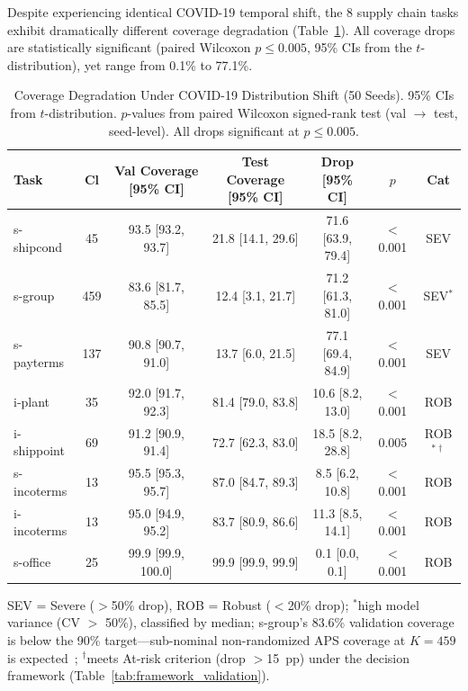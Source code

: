 \documentclass{uai2026} %
\begin{document}
Despite experiencing identical COVID-19 temporal shift, the 8 supply chain tasks exhibit dramatically different coverage degradation (Table~\ref{tab:main_results}). All coverage drops are statistically significant (paired Wilcoxon $p \leq 0.005$, 95\% CIs from the $t$-distribution), yet range from 0.1\% to 77.1\%.

\begin{table}[t]
\centering
\caption{Coverage Degradation Under COVID-19 Distribution Shift (50 Seeds).
95\% CIs from $t$-distribution. $p$-values from paired Wilcoxon signed-rank test
(val $\rightarrow$ test, seed-level). All drops significant at $p \leq 0.005$.}\label{tab:main_results}
\small
\begin{tabular}{@{}lcccccc@{}}
\toprule
Task & Cl & Val Coverage [95\% CI] & Test Coverage [95\% CI] & Drop [95\% CI] & $p$ & Cat \\
\midrule
s-shipcond & 45 & 93.5 [93.2, 93.7] & 21.8 [14.1, 29.6] & 71.6 [63.9, 79.4] & $<$0.001 & SEV \\
s-group & 459 & 83.6 [81.7, 85.5] & 12.4 [3.1, 21.7] & 71.2 [61.3, 81.0] & $<$0.001 & SEV$^*$ \\
s-payterms & 137 & 90.8 [90.7, 91.0] & 13.7 [6.0, 21.5] & 77.1 [69.4, 84.9] & $<$0.001 & SEV \\
i-plant & 35 & 92.0 [91.7, 92.3] & 81.4 [79.0, 83.8] & 10.6 [8.2, 13.0] & $<$0.001 & ROB \\
i-shippoint & 69 & 91.2 [90.9, 91.4] & 72.7 [62.3, 83.0] & 18.5 [8.2, 28.8] & 0.005 & ROB$^{*\dagger}$ \\
s-incoterms & 13 & 95.5 [95.3, 95.7] & 87.0 [84.7, 89.3] & 8.5 [6.2, 10.8] & $<$0.001 & ROB \\
i-incoterms & 13 & 95.0 [94.9, 95.2] & 83.7 [80.9, 86.6] & 11.3 [8.5, 14.1] & $<$0.001 & ROB \\
s-office & 25 & 99.9 [99.9, 100.0] & 99.9 [99.9, 99.9] & 0.1 [0.0, 0.1] & $<$0.001 & ROB \\
\bottomrule
\end{tabular}


\raggedright
\footnotesize
SEV = Severe ($>$50\% drop), ROB = Robust ($<$20\% drop); $^*$high model variance (CV $>$ 50\%), classified by median; s-group's 83.6\% validation coverage is below the 90\% target---sub-nominal non-randomized APS coverage at $K=459$ is expected~\citep{ding2023class}; $^\dagger$meets At-risk criterion (drop $>$15~pp) under the decision framework (Table~\ref{tab:framework_validation}).
\end{table}
\end{document}
